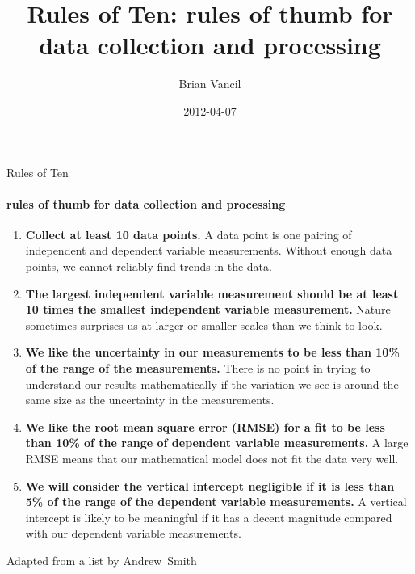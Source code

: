 \documentclass[final]{beamer} %
\title[Rules of Ten]{Rules of Ten: rules of thumb for data collection and processing}
\author[Vancil]{Brian Vancil}
\institute[Sumner]{Sumner Academy of Arts & Sciences}
\date{2012-04-07}
\newcommand{\header}[1]{\textcolor{royalblueweb}{\textbf{#1}}}
\newcommand{\spacing}{\vspace{1.0em}}
\newcommand{\parasep}{\vspace{-0.0\baselineskip}\textcolor{silver}{\large\hfill\FiveStar\hfill\FiveStar\hfill\FiveStar\hfill}\vspace{-0.0\baselineskip}}
\begin{document}
  \begin{frame}{Rules of Ten} 
  \framesubtitle{rules of thumb for data collection and processing}
  \vspace{-1.5em}\parasep
	\begin{enumerate}
	
\item \header{Collect at least 10 data points.}  A data point is one pairing of independent and dependent variable measurements.  Without enough data points, we cannot reliably find trends in the data. \spacing

\item \header{The largest independent variable measurement should be at least 10 times the smallest independent variable measurement.}  Nature sometimes surprises us at larger or smaller scales than we think to look. \spacing

\item \header{We like the uncertainty in our measurements to be less than 10\% of the range of the measurements.}  There is no point in trying to understand our results mathematically if the variation we see is around the same size as the uncertainty in the measurements. \spacing

\item \header{We like the root mean square error (RMSE) for a fit to be less than 10\% of the range of dependent variable measurements.}  A large RMSE means that our mathematical model does not fit the data very well. \spacing

\item \header{We will consider the vertical intercept negligible if it is less than 5\% of the range of the dependent variable measurements.}  A vertical intercept is likely to be meaningful if it has a decent magnitude compared with our dependent variable measurements.

	\end{enumerate}
        \spacing\parasep
	\begin{center}\footnotesize
	 Adapted from a list by Andrew~Smith
	\end{center}
  \end{frame}
  
\end{document}
